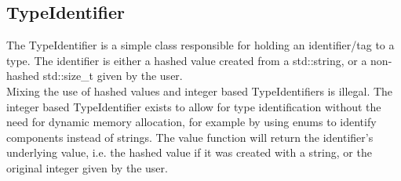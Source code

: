 \subsection{TypeIdentifier}

The TypeIdentifier is a simple class responsible for holding an identifier/tag to a type. 
The identifier is either a hashed value created from a std::string, or a non-hashed std::size\_t given by the user.\\
Mixing the use of hashed values and integer based TypeIdentifiers is illegal. 
The integer based TypeIdentifier exists to allow for type identification without the need for dynamic
memory allocation, for example by using enums to identify components instead of strings.
The value function will return the identifier's underlying value, i.e. the hashed value if it was created with a string, 
or the original integer given by the user.
